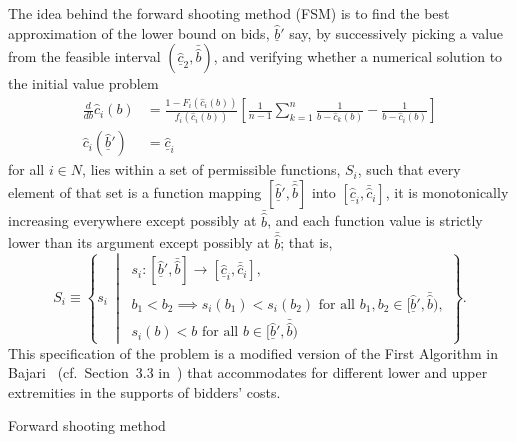 The idea behind the forward shooting method (FSM) is to find the best approximation of the lower bound on bids, $\underline{\hat{b}}'$ say, by successively picking a value from the feasible interval $(\underline{\hat{c}}_2, \bar{\hat{b}})$, and verifying whether a numerical solution to the initial value problem
\begin{equation}
  \label{eq:fsm_initial_value_problem_indirect}
  \begin{array}{ll}
    \displaystyle\frac{d}{db}\hat{c}_i(b) &= \displaystyle\frac{1 - F_i(\hat{c}_i(b))}{f_i(\hat{c}_i(b))}\left[ \frac{1}{n-1}\sum_{k=1}^n\frac{1}{b - \hat{c}_k(b)} - \frac{1}{b - \hat{c}_i(b)} \right] \\[2ex]
    \hat{c}_i(\underline{\hat{b}}') &= \underline{\hat{c}}_i
  \end{array}
\end{equation}
for all $i\in N$, lies within a set of permissible functions, $S_i$, such that every element of that set is a function mapping $[\underline{\hat{b}}', \bar{\hat{b}}]$ into $[\underline{\hat{c}}_i, \bar{\hat{c}}_i]$, it is monotonically increasing everywhere except possibly at $\bar{\hat{b}}$, and each function value is strictly lower than its argument except possibly at $\bar{\hat{b}}$; that is,
\begin{equation*}
  S_i\equiv\left\{s_i \:\middle\vert\:
  \begin{array}{l}
    s_i: [\underline{\hat{b}}', \bar{\hat{b}}]\to [\underline{\hat{c}}_i, \bar{\hat{c}}_i],\\
    b_1 < b_2\implies s_i(b_1) < s_i(b_2) \text{ for all }b_1,b_2\in [\underline{\hat{b}}', \bar{\hat{b}}),\\
    s_i(b) < b \text{ for all }b\in [\underline{\hat{b}}', \bar{\hat{b}})
  \end{array}
  \right\}.
\end{equation*}
This specification of the problem is a modified version of the First Algorithm in Bajari~\cite{Bajari2001a} (cf.~Section~3.3 in~\cite{Bajari2001a}) that accommodates for different lower and upper extremities in the supports of bidders' costs.

\begin{algorithm}
\caption{Forward shooting method}
\label{alg:forward_shooting_method_indirect}
\begin{algorithmic}[1]
  \Statex
  \Statex
    \Let{$bids$}{$[guess, \bar{\hat{b}})$}
    \Else
    \EndIf
  \EndWhile
  \Statex
\end{algorithmic}
\end{algorithm}

